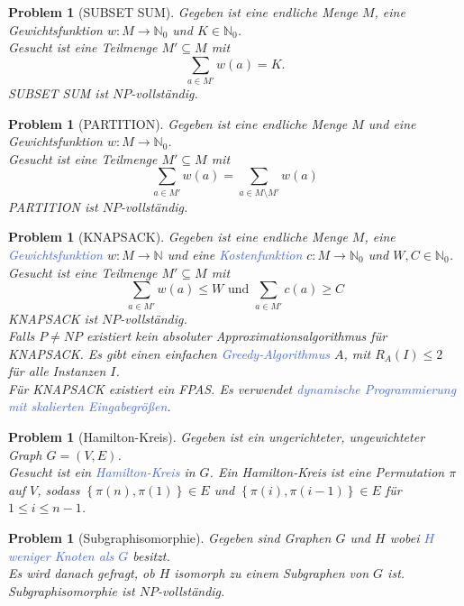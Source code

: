 \documentclass[11pt]{scrartcl}
\newcommand{\tcol}[1]{\textcolor{RoyalBlue}{#1}}
\newcommand{\set}[1]{\left\lbrace #1\right\rbrace}
\theoremstyle{break}
\newtheorem{prob}[satz]{Problem}
\begin{document}
    \begin{prob}[SUBSET SUM]
        Gegeben ist eine endliche Menge $M$, eine Gewichtsfunktion $w\colon M\to\mathbb{N}_0$ und $K\in\mathbb{N}_0$.\\
        Gesucht ist eine Teilmenge $M'\subseteq M$ mit
        \[\sum_{a\in M'}w(a)=K.\]
        SUBSET SUM ist $NP$-vollständig.
    \end{prob}

    \begin{prob}[PARTITION]
        Gegeben ist eine endliche Menge $M$ und eine Gewichtsfunktion $w\colon M\to\mathbb{N}
        _0$.\\
        Gesucht ist eine Teilmenge $M'\subseteq M$ mit
        \[\sum_{a\in M'}w(a)=\sum_{a\in M\setminus M'}w(a)\]
        PARTITION ist $NP$-vollständig.
    \end{prob}

    \begin{prob}[KNAPSACK]
        Gegeben ist eine endliche Menge $M$, eine \tcol{Gewichtsfunktion} $w\colon M\to\mathbb{N}$ und eine \tcol{Kostenfunktion} $c\colon M\to\mathbb{N}
        _0$ und $W,C\in\mathbb{N}_0$.\\
        Gesucht ist eine Teilmenge $M'\subseteq M$ mit
        \[\sum_{a\in M'}w(a)\leq W\text{ und }\sum_{a\in M'}c(a)\geq C\]
        KNAPSACK ist $NP$-vollständig.\\
        Falls $P\neq NP$ existiert kein absoluter Approximationsalgorithmus für KNAPSACK. Es gibt einen einfachen \tcol{Greedy-Algorithmus} $A$, mit $R_A(I)\leq 2$ für alle Instanzen $I$.\\
        Für KNAPSACK existiert ein FPAS. Es verwendet \tcol{dynamische Programmierung mit skalierten Eingabegrößen}.
    \end{prob}

    \begin{prob}[Hamilton-Kreis]
        Gegeben ist ein ungerichteter, ungewichteter Graph $G=(V,E)$.\\
        Gesucht ist ein \tcol{Hamilton-Kreis} in $G$.
        Ein Hamilton-Kreis ist eine Permutation $\pi$ auf $V$, sodass $\set{\pi(n),\pi(1)}\in E$ und $\set{\pi(i),\pi(i-1)}\in E$ für $1\leq i\leq n-1$.
    \end{prob}

    \begin{prob}[Subgraphisomorphie]
        Gegeben sind Graphen $G$ und $H$ wobei \tcol{$H$ weniger Knoten als $G$} besitzt.\\
        Es wird danach gefragt, ob $H$ isomorph zu einem Subgraphen von $G$ ist.\\
        Subgraphisomorphie ist $NP$-vollständig.
    \end{prob}
\end{document}
